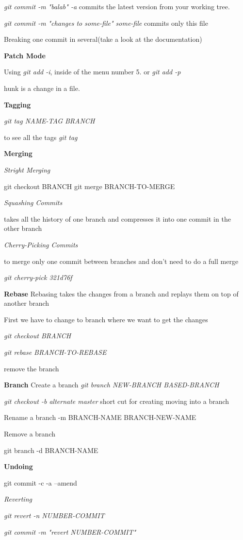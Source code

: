 \documentclass[12pt]{article}
\newcommand \tb[1]{\textbf{#1}}
\newcommand \ti[1]{\textit{#1}}
\begin{document}
\ti{git commit -m "balab" -a}
commits the latest version from your working  tree.


\ti{git commit -m "changes to some-file" some-file}
commits only this file


Breaking one commit in several(take a look at the documentation)


\tb{Patch Mode}
 
Using \ti{git add -i}, inside of the menu number 5. or 
\ti{git add -p}

hunk is a change in a file.

\textbf{Tagging}

\ti{git tag NAME-TAG BRANCH}
 
to see all the tags \ti{git tag}


\tb{Merging}

\ti{Stright Merging}

git checkout BRANCH
git merge BRANCH-TO-MERGE

\ti{Squashing Commits}

takes all the history of one branch and compresses it into one commit in the other branch

\ti{Cherry-Picking Commits}

to merge only one commit between branches and don’t need to do a full merge

\ti{git cherry-pick 321d76f}

\textbf{Rebase}
Rebasing takes the changes from a branch and replays them on top of another branch

First we have to change to branch where we want to get the changes 

\ti{git checkout BRANCH}

\ti{git rebase BRANCH-TO-REBASE}

remove the branch

\textbf{Branch}
Create a branch
\ti{git branch NEW-BRANCH  BASED-BRANCH}

\ti{git checkout -b alternate master} short cut for creating moving into a
branch

Rename a branch -m BRANCH-NAME BRANCH-NEW-NAME

Remove a branch

git branch -d BRANCH-NAME

\tb{Undoing}

git commit -c -a --amend

\ti{Reverting}

\ti{git revert -n NUMBER-COMMIT}

\ti{git commit -m "revert NUMBER-COMMIT"}
\end{document}
